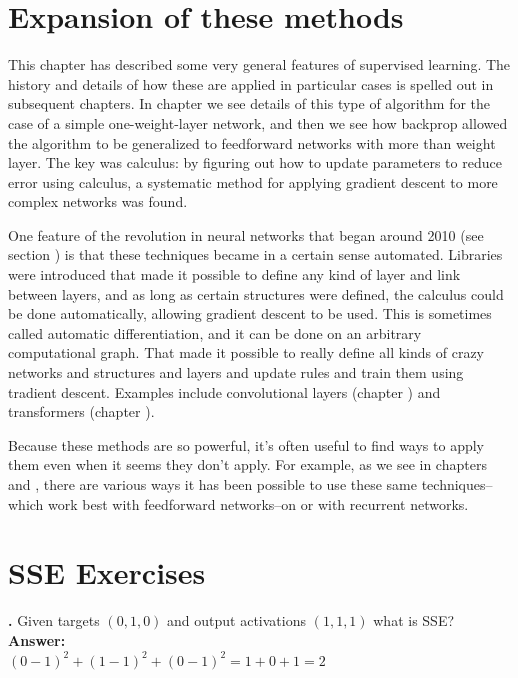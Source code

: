 { \section{Expansion of these methods}
 
 This chapter has described some very general features of supervised learning. The history and details of how these are applied in particular cases is spelled out in subsequent chapters.  In chapter  we see details of this type of algorithm for the case of a simple one-weight-layer network, and then we see how backprop allowed the algorithm to be generalized to feedforward networks with more than weight layer. The key was calculus: by figuring out how to update parameters to reduce error using calculus, a systematic method for applying gradient descent to more complex networks was found.
 
One feature of the revolution in neural networks that began around 2010 (see section ) is that these techniques became in a certain sense automated. Libraries were introduced that made it possible to define any kind of layer and link between layers, and as long as certain structures were defined, the calculus could be done automatically, allowing gradient descent to be used.  This is sometimes called automatic differentiation, and it can be done on an arbitrary computational graph.  That made it possible to really define all kinds of crazy networks and structures and layers and update rules and train them using tradient descent. Examples include convolutional layers (chapter ) and transformers  (chapter ).
 
Because these methods are so powerful, it's often useful to find ways to apply them even when it seems they don't apply. For example, as we see in chapters  and , there are various ways it has been possible to use these same techniques--which work best with feedforward networks--on or with recurrent networks.  
 
\section{SSE Exercises}


\noindent
{}
{\bf \theSSECounter.}  Given targets $(0,1,0)$ and output activations $(1,1,1)$ what is SSE? \\
{\bf Answer:}  \\
$(0-1)^2 + (1-1)^2 + (0-1)^2 = 1 + 0 + 1 = 2$
\bigskip

}
